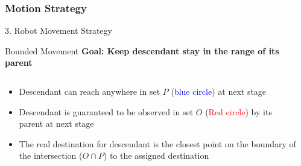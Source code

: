 \documentclass[10pt]{beamer}
\begin{document}
\subsubsection{Motion Strategy}
\begin{frame}{3. Robot Movement Strategy}{}
  
\end{frame}
\begin{frame}{Bounded Movement}{}
  \textbf{Goal: Keep descendant stay in the range of its parent}
    \begin{columns}[T] %
      \begin{column}{.4\textwidth}
        \begin{itemize}
        \item \small{Descendant can reach anywhere in set $P$
            (\textcolor{blue}{blue circle}) at next stage}
        \item \small{Descendant is guaranteed to be observed in set $O$
            (\textcolor{red}{Red circle}) by its parent at next stage}
        \item \small{The real destination for descendant is the closest point
            on the boundary of the intersection ($O\cap P$) to the
            assigned destination}
        \end{itemize}
      \end{column}%
      \begin{column}{.5\textwidth}
             
      \end{column}%
    \end{columns} 
\end{frame}
\end{document}
